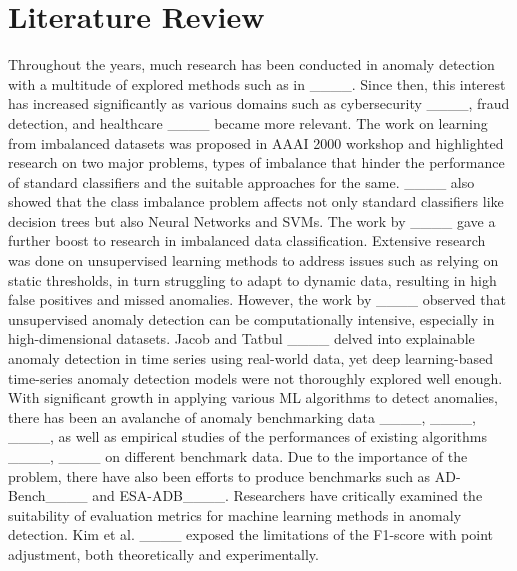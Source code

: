 \section{Literature Review}
\label{sec:a5}
Throughout the years, much research has been conducted in anomaly detection with a multitude of explored methods such as in ____. Since then, this interest has increased significantly as various domains such as cybersecurity ____, fraud detection, and healthcare ____ became more relevant. 
The work on learning from imbalanced datasets was proposed in AAAI 2000 workshop 
and highlighted research on two major problems, types of imbalance that hinder the performance of standard classifiers and the suitable approaches for the same. ____ also showed that the class imbalance problem affects not only standard classifiers like decision trees but also Neural Networks and SVMs. The work by ____
gave a further boost to research in imbalanced data classification. Extensive research was done on unsupervised learning methods to address issues such as relying on static thresholds, in turn struggling to adapt to dynamic data, resulting in high false positives and missed anomalies. However, the work by ____ observed that unsupervised anomaly detection can be computationally intensive, especially in high-dimensional datasets. Jacob and Tatbul ____ delved into explainable anomaly detection in time series using real-world data, yet deep learning-based time-series anomaly detection models were not thoroughly explored well enough. %
With significant growth in applying various ML algorithms
to detect anomalies, there has been an avalanche of anomaly
benchmarking data ____, ____, ____, as well as empirical studies of the performances of existing algorithms ____, ____ on different benchmark data. Due to the importance of the problem, there have also been efforts to produce benchmarks such as AD-Bench____ and ESA-ADB____. %
Researchers have critically examined the suitability of evaluation metrics for machine learning methods in anomaly detection. Kim et al. ____ exposed the limitations of the F1-score with point adjustment, both theoretically and experimentally. 

